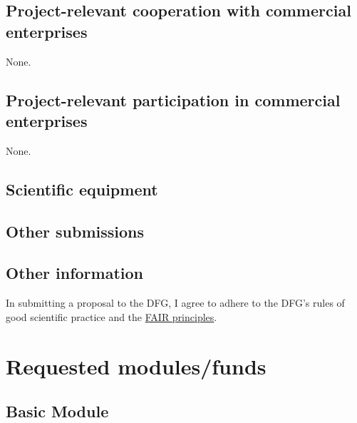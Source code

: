 \documentclass{scrartcl}
\begin{document}
\subsection{Project-relevant cooperation with commercial enterprises}
None.

\subsection{Project-relevant participation in commercial enterprises}
None.

\subsection{Scientific equipment}

\subsection{Other submissions}

\subsection{Other information}
In submitting a proposal to the DFG, I agree to adhere to the DFG's rules of good scientific practice and the \href{https://www.nature.com/articles/sdata201618}{FAIR principles}.

\section{Requested modules/funds}

\subsection{Basic Module}
\end{document}
